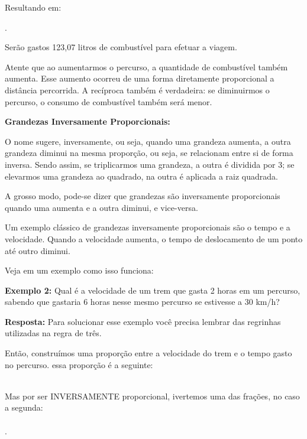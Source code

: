 \begin{multicols*}{2}
	Resultando em:


	.

	Serão gastos 123,07 litros de combustível para efetuar a viagem.

	Atente que ao aumentarmos o percurso, a quantidade de combustível também aumenta. Esse aumento ocorreu de uma forma diretamente proporcional a distância percorrida. A recíproca também é verdadeira: se diminuirmos o percurso, o consumo de combustível também será menor.

	\textbf{Grandezas Inversamente Proporcionais:}

	O nome sugere, inversamente, ou seja, quando uma grandeza aumenta, a outra grandeza diminui na mesma proporção, ou seja, se relacionam entre si de forma inversa. Sendo assim, se triplicarmos uma grandeza, a outra é dividida por 3; se elevarmos uma grandeza ao quadrado, na outra é aplicada a raiz quadrada.

	A grosso modo, pode-se dizer que grandezas são inversamente proporcionais quando uma aumenta e a outra diminui, e vice-versa.

	Um exemplo clássico de grandezas inversamente proporcionais são o tempo e a velocidade. Quando a velocidade aumenta, o tempo de deslocamento de um ponto até outro diminui.

	Veja em um exemplo como isso funciona:

	\textbf{Exemplo 2:} Qual é a velocidade de um trem que gasta 2 horas em um percurso, sabendo que gastaria 6 horas nesse mesmo percurso se estivesse a 30 km/h?

	\textbf{Resposta:} Para solucionar esse exemplo você precisa lembrar das regrinhas utilizadas na regra de três.

	Então, construímos uma proporção entre a velocidade do trem e o tempo gasto no percurso. essa proporção é a seguinte:

	\\

	Mas por ser INVERSAMENTE proporcional, ivertemos uma das frações, no caso a segunda:\\

	\\

	.


\end{multicols*}
